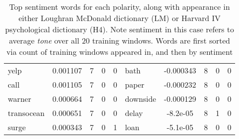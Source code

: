 \documentclass[ oneside,%
                    author={Joshua Felmeden},
                    degree={MEng},
                     title={Sentiment Analysis of Financial Headlines Based on Realised Stock Returns},
                  subtitle={Research}]{dissertation}
\begin{document}
\begin{table}[!ht]
\begin{tabular}{lcccclcccc}
yelp & 0.001107 & 7 & 0 & 0 & bath & -0.000343 & 8 & 0 & 0 \\
call & 0.001105 & 7 & 0 & 0 & paper & -0.000232 & 8 & 0 & 0 \\
warner & 0.000664 & 7 & 0 & 0 & downside & -0.000129 & 8 & 0 & 0 \\
transocean & 0.000651 & 7 & 0 & 0 & delay & -8.2e-05 & 8 & 1 & 0 \\
surge & 0.000343 & 7 & 0 & 1 & loan & -5.1e-05 & 8 & 0 & 0 \\
\bottomrule
\end{tabular}
\caption[Sentiment word list for unigrams]{Top sentiment words for each polarity, along with appearance in either Loughran McDonald dictionary (LM) or Harvard IV psychological dictionary (H4). Note sentiment in this case refers to average \textit{tone} over all 20 training windows. Words are first sorted via count of training windows appeared in, and then by sentiment}
\end{table}
\end{document}
